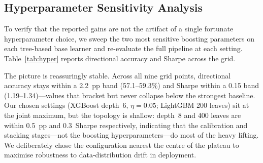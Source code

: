 \begin{table}[t]
\centering
\caption{Ablation study on the 2024 NIFTY~50 holdout.}
\label{tab:ablation}
\end{table}

\subsection{Hyperparameter Sensitivity Analysis}
\label{subsec:hyper}

To verify that the reported gains are not the artifact of a single fortunate
hyperparameter choice, we sweep the two most sensitive boosting parameters
on each tree-based base learner and re-evaluate the full pipeline at each
setting. Table~\ref{tab:hyper} reports directional accuracy and Sharpe
across the grid.

The picture is reassuringly stable. Across all nine grid points, directional
accuracy stays within a 2.2~pp band (57.1--59.3\%) and Sharpe within a
0.15 band (1.19--1.34)---values that bracket but never collapse below the
strongest baseline. Our chosen settings
(XGBoost depth~6, $\eta\!=\!0.05$; LightGBM 200 leaves) sit at the joint
maximum, but the topology is shallow: depth~8 and 400 leaves are within
0.5~pp and 0.3~Sharpe respectively, indicating that the calibration and
stacking stages---not the boosting hyperparameters---do most of the heavy
lifting. We deliberately chose the configuration nearest the centre of the
plateau to maximise robustness to data-distribution drift in deployment.

